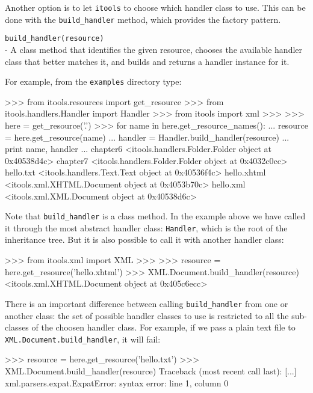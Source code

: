Another option is to let {\tt itools} to choose which handler class to use.
This can be done with the {\tt build\_handler} method, which provides the
factory pattern.

\begin{api}
  {\tt build\_handler(resource)}\\
  - A class method that identifies the given resource, chooses the available
  handler class that better matches it, and builds and returns a handler
  instance for it.
\end{api}

For example, from the {\tt examples} directory type:

\begin{code}
    >>> from itools.resources import get_resource
    >>> from itools.handlers.Handler import Handler
    >>> from itools import xml
    >>> 
    >>> here = get_resource('.')
    >>> for name in here.get_resource_names():
    ...     resource = here.get_resource(name)
    ...     handler = Handler.build_handler(resource)
    ...     print name, handler
    ... 
    chapter6 <itools.handlers.Folder.Folder object at 0x40538d4c>
    chapter7 <itools.handlers.Folder.Folder object at 0x4032c0cc>
    hello.txt <itools.handlers.Text.Text object at 0x40536f4c>
    hello.xhtml <itools.xml.XHTML.Document object at 0x4053b70c>
    hello.xml <itools.xml.XML.Document object at 0x40538d6c>
\end{code}

Note that {\tt build\_handler} is a class method. In the example above
we have called it through the most abstract handler class: {\tt Handler},
which is the root of the inheritance tree. But it is also possible to call
it with another handler class:

\begin{code}
    >>> from itools.xml import XML
    >>> 
    >>> resource = here.get_resource('hello.xhtml')
    >>> XML.Document.build_handler(resource)
    <itools.xml.XHTML.Document object at 0x405c6ecc>
\end{code}

There is an important difference between calling {\tt build\_handler} from
one or another class: the set of possible handler classes to use is
restricted to all the sub-classes of the choosen handler class. For example,
if we pass a plain text file to {\tt XML.Document.build\_handler}, it will
fail:

\begin{code}
    >>> resource = here.get_resource('hello.txt')
    >>> XML.Document.build_handler(resource)
    Traceback (most recent call last):
      [...]
    xml.parsers.expat.ExpatError: syntax error: line 1, column 0
\end{code}


